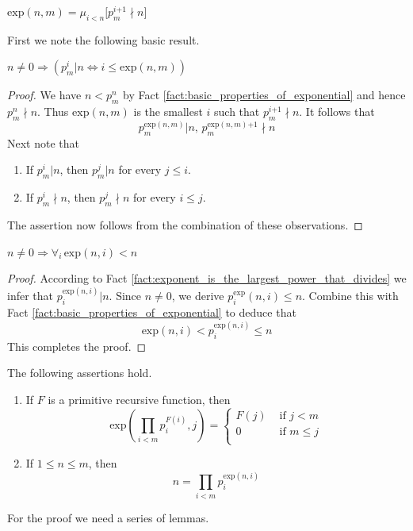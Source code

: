 \documentclass[10pt]{amsart}
\newcommand{\mforall}{\boldsymbol{\forall}}
\newcommand{\mra}{\boldsymbol{\Rightarrow}}
\newcommand{\mequiv}{\boldsymbol{\Leftrightarrow}}
\newcommand{\mle}{\boldsymbol{<}}
\newcommand{\mleq}{\boldsymbol{\leq}}
\newcommand{\meq}{\boldsymbol{=}}
\newcommand{\mneq}{\boldsymbol{\neq}}
\newcommand{\mplus}{\boldsymbol{+}}
\begin{document}
\begin{definition}
	$\mathrm{exp}(n,m) \meq \mu_{i \mle n}\big[p_m^{i\mplus1}\nmid n\big]$
\end{definition}
\noindent
First we note the following basic result.

\begin{fact}\label{fact:exponent_is_the_largest_power_that_divides}
	$n\mneq 0 \mra \left(p_m^i|n \mequiv i \mleq \mathrm{exp}(n,m)\right)$
\end{fact}
\begin{proof}
	We have $n \mle p_m^n$ by Fact \ref{fact:basic_properties_of_exponential} and hence $p_m^n\nmid n$. Thus $\mathrm{exp}(n,m)$ is the smallest $i$ such that $p_m^{i\mplus1}\nmid n$. It follows that
	$$p_m^{\mathrm{exp}(n,m)}|n,\,p_m^{\mathrm{exp}(n,m) \mplus 1}\nmid n$$
	Next note that
	\begin{enumerate}[label=\textbf{(\arabic*)}, leftmargin=3.0em]
		\item If $p_m^i|n$, then $p_m^j|n$ for every $j \mleq i$.
		\item If $p_m^i\nmid n$, then $p_m^j\nmid n$ for every $i \mleq j$.
	\end{enumerate}
	The assertion now follows from the combination of these observations.
\end{proof}

\begin{fact}\label{fact:exponent_is_smaller_than_number}
  $n \mneq 0 \mra \mforall_i\,\mathrm{exp}(n,i) \mle n$
\end{fact}
\begin{proof}
  According to Fact \ref{fact:exponent_is_the_largest_power_that_divides} we infer that $p_i^{\mathrm{exp}(n,i)}|n$. Since $n \mneq 0$, we derive $p_i^\mathrm{exp}(n,i) \mleq n$. Combine this with Fact \ref{fact:basic_properties_of_exponential} to deduce that
  $$\mathrm{exp}(n,i) \mle p_i^{\mathrm{exp}(n,i)} \mleq n$$
  This completes the proof.
\end{proof}

\begin{theorem}\label{theorem:unique_prime_factorization}
	The following assertions hold.
	\begin{enumerate}[label=\emph{\textbf{(\arabic*)}}, leftmargin=3.0em]
		\item If $F$ is a primitive recursive function, then
		      $$\mathrm{exp}\left(\prod_{i \mle m}p_i^{F(i)},j\right) \meq \begin{cases}
				      F(j) & \mbox{ if }j \mle m    \\
				      0    & \mbox{ if }m \mleq j \\
			      \end{cases}$$
		\item If $1 \mleq n \mleq m$, then
		      $$n \meq \prod_{i \mle m}p_i^{\mathrm{exp}(n,i)}$$
	\end{enumerate}
\end{theorem}
\noindent
For the proof we need a series of lemmas.
\end{document}
